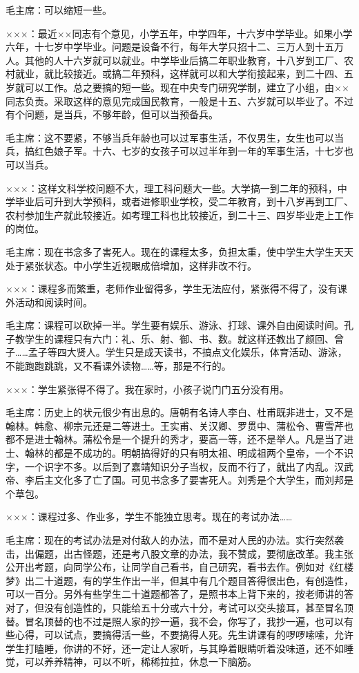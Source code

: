 毛主席：可以缩短一些。

×××：最近××同志有个意见，小学五年，中学四年，十六岁中学毕业。如果小学六年，十七岁中学毕业。问题是设备不行，每年大学只招十二、三万人到十五万人。其他的人十六岁就可以就业。中学毕业后搞二年职业教育，十八岁到工厂、农村就业，就比较接近。或搞二年预科，这样就可以和大学衔接起来，到二十四、五岁就可以工作。总之要搞的短一些。现在中央专门研究学制，建立了小组，由××同志负责。采取这样的意见完成国民教育，一般是十五、六岁就可以毕业了。不过有个问题，是当兵，不够年龄，但可以当预备兵。

毛主席：这不要紧，不够当兵年龄也可以过军事生活，不仅男生，女生也可以当兵，搞红色娘子军。十六、七岁的女孩子可以过半年到一年的军事生活，十七岁也可以当兵。

×××：这样文科学校问题不大，理工科问题大一些。大学搞一到二年的预科，中学毕业后可升到大学预科，或者进修职业学校，受二年教育，到十八岁再到工厂、农村参加生产就此较接近。如考理工科也比较接近，到二十三、四岁毕业走上工作的岗位。

毛主席：现在书念多了害死人。现在的课程太多，负担太重，使中学生大学生天天处于紧张状态。中小学生近视眼成倍增加，这样非改不行。

×××：课程多而繁重，老师作业留得多，学生无法应付，紧张得不得了，没有课外活动和阅读时间。

毛主席：课程可以砍掉一半。学生要有娱乐、游泳、打球、课外自由阅读时间。孔子教学生的课程只有六门：礼、乐、射、御、书、数。就这样还教出了颜回、曾子……孟子等四大贤人。学生只是成天读书，不搞点文化娱乐，体育活动、游泳，不能跑跑跳跳，又不看课外读物……等，那是不行的。

×××：学生紧张得不得了。我在家时，小孩子说门门五分没有用。

毛主席：历史上的状元很少有出息的。唐朝有名诗人李白、杜甫既非进士，又不是翰林。韩愈、柳宗元还是二等进士。王实甫、关汉卿、罗贯中、蒲松令、曹雪芹也都不是进士翰林。蒲松令是一个提升的秀才，要高一等，还不是举人。凡是当了进士、翰林的都是不成功的。明朝搞得好的只有明太祖、明成祖两个皇帝，一个不识字，一个识字不多。以后到了嘉靖知识分子当权，反而不行了，就出了内乱。汉武帝、李后主文化多了亡了国。可见书念多了要害死人。刘秀是个大学生，而刘邦是个草包。

×××：课程过多、作业多，学生不能独立思考。现在的考试办法……

毛主席：现在的考试办法是对付敌人的办法，而不是对人民的办法。实行突然袭击，出偏题，出古怪题，还是考八股文章的办法，我不赞成，要彻底改革。我主张公开出考题，向同学公布，让同学自己看书，自己研究，看书去作。例如对《红楼梦》出二十道题，有的学生作出一半，但其中有几个题目答得很出色，有创造性，可以一百分。另外有些学生二十道题都答了，是照书本上背下来的，按老师讲的答对了，但没有创造性的，只能给五十分或六十分，考试可以交头接耳，甚至冒名顶替。冒名顶替的也不过是照人家的抄一遍，我不会，你写了，我抄一遍，也可以有些心得，可以试点，要搞得活一些，不要搞得人死。先生讲课有的啰啰嗦嗦，允许学生打瞌睡，你讲的不好，还一定让人家听，与其睁着眼睛听着没味道，还不如睡觉，可以养养精神，可以不听，稀稀拉拉，休息一下脑筋。

